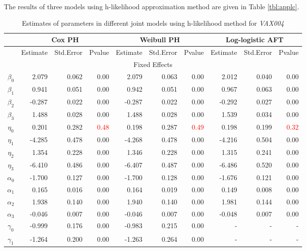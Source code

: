 The results of three models using h-likelihood approximation method are given in Table \ref{tbl:applc}.
\begin{table}[ht]
\centering
\caption{Estimates of parameters in different joint models using h-likelihood method for \textit{VAX004}}
\begin{tabular}{c|rrr|rrr|rrr}
  \hline
  \multirow{2}{*}{} &  \multicolumn{3}{c|}{Cox PH} &  \multicolumn{3}{c|}{Weibull PH}   &  \multicolumn{3}{c}{Log-logistic AFT} \\
   \hline
   & Estimate & Std.Error & Pvalue & Estimate & Std.Error & Pvalue & Estimate & Std.Error & Pvalue \\ 
  \hline
  \multicolumn{10}{c}{Fixed Effects} \\
  \hline
  $\beta_0$ & 2.079 & 0.062 & 0.00 & 2.079 & 0.063 & 0.00 & 2.012 & 0.040 & 0.00 \\ 
  $\beta_1$ & 0.941 & 0.051 & 0.00 & 0.942 & 0.051 & 0.00 & 0.967 & 0.063 & 0.00 \\ 
  $\beta_2$ & -0.287 & 0.022 & 0.00 & -0.287 & 0.022 & 0.00 & -0.292 & 0.027 & 0.00 \\ 
  $\beta_3$ & 1.488 & 0.028 & 0.00 & 1.488 & 0.028 & 0.00 & 1.539 & 0.034 & 0.00 \\ 
  \hline
  $\eta_0$ & 0.201 & 0.282 & \textcolor{red}{0.48} & 0.198 & 0.287 & \textcolor{red}{0.49} & 0.198 & 0.199 & \textcolor{red}{0.32} \\ 
  $\eta_1$ & -4.285 & 0.478 & 0.00 & -4.268 & 0.478 & 0.00 & -4.216 & 0.504 & 0.00 \\ 
  $\eta_2$ & 1.354 & 0.228 & 0.00 & 1.346 & 0.228 & 0.00 & 1.315 & 0.241 & 0.00 \\ 
  $\eta_3$ & -6.410 & 0.486 & 0.00 & -6.407 & 0.487 & 0.00 & -6.486 & 0.520 & 0.00 \\ 
  \hline
  $\alpha_0$ & -1.700 & 0.127 & 0.00 & -1.700 & 0.128 & 0.00 & -1.676 & 0.121 & 0.00 \\ 
  $\alpha_1$ & 0.165 & 0.016 & 0.00 & 0.164 & 0.019 & 0.00 & 0.149 & 0.008 & 0.00 \\ 
  $\alpha_2$ & 1.938 & 0.140 & 0.00 & 1.940 & 0.140 & 0.00 & 1.981 & 0.144 & 0.00 \\ 
  $\alpha_3$ & -0.046 & 0.007 & 0.00 & -0.046 & 0.007 & 0.00 & -0.048 & 0.007 & 0.00 \\ 
  \hline
  $\gamma_0$ & -0.999 & 0.176 & 0.00 & -0.983 & 0.215 & 0.00 & - & - & - \\ 
  $\gamma_1$ & -1.264 & 0.200 & 0.00 & -1.263 & 0.264 & 0.00 & - & - & - \\ 

\end{tabular}
\end{table}
